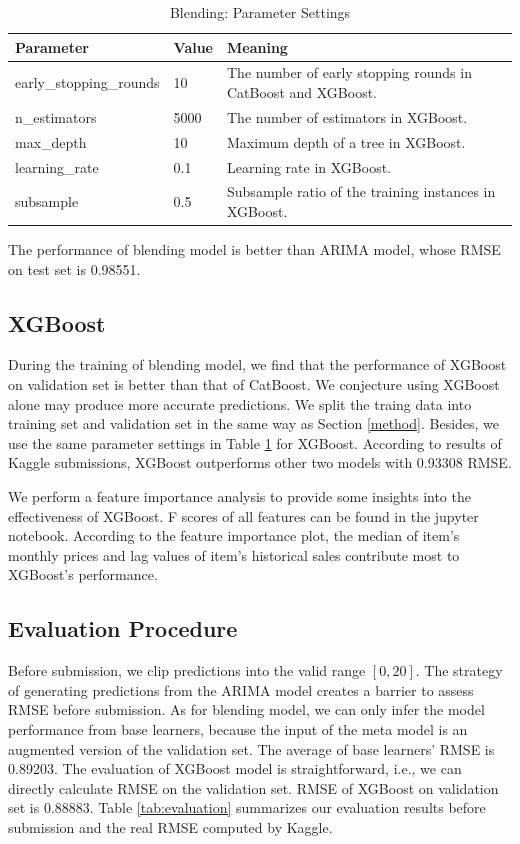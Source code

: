 \documentclass{article}
\begin{document}
\begin{table}[!ht]
    \centering
    \caption{Blending: Parameter Settings}
    \label{tab:blending}
    \begin{tabular}{lll}
        \toprule
        \textbf{Parameter} & \textbf{Value} & \textbf{Meaning}\\
        \midrule
        early\_stopping\_rounds & 10 & The number of early stopping rounds in CatBoost and XGBoost.\\
        n\_estimators & 5000 & The number of estimators in XGBoost.\\
        max\_depth & 10 & Maximum depth of a tree in XGBoost.\\
        learning\_rate & 0.1 & Learning rate in XGBoost.\\
        subsample & 0.5 & Subsample ratio of the training instances in XGBoost.\\
        \bottomrule
    \end{tabular}
\end{table}

The performance of blending model is better than ARIMA model, whose RMSE on test set is 0.98551.

\subsection{XGBoost}
During the training of blending model, we find that the performance of XGBoost on validation set is better than that of CatBoost. We conjecture using XGBoost alone may produce more accurate predictions. We split the traing data into training set and validation set in the same way as Section \ref{method}. Besides, we use the same parameter settings in Table \ref{tab:blending} for XGBoost. According to results of Kaggle submissions, XGBoost outperforms other two models with 0.93308 RMSE.\par

We perform a feature importance analysis to provide some insights into the effectiveness of XGBoost. F scores of all features can be found in the jupyter notebook. According to the feature importance plot, the median of item's monthly prices and lag values of item's historical sales contribute most to XGBoost's performance.

\subsection{Evaluation Procedure}
Before submission, we clip predictions into the valid range $[0, 20]$. The strategy of generating predictions from the ARIMA model creates a barrier to assess RMSE before submission. As for blending model, we can only infer the model performance from base learners, because the input of the meta model is an augmented version of the validation set. The average of base learners' RMSE is 0.89203. The evaluation of XGBoost model is straightforward, i.e., we can directly calculate RMSE on the validation set. RMSE of XGBoost on validation set is 0.88883. Table \ref{tab:evaluation} summarizes our evaluation results before submission and the real RMSE computed by Kaggle.
\end{document}
